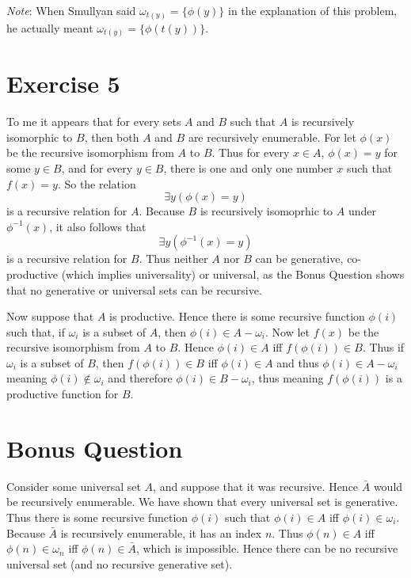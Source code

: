 \documentclass{article}
\theoremstyle{definition}
\begin{document}
\textit{Note}: When Smullyan said $\omega_{t(y)}=\{\phi(y)\}$ in the explanation of this problem, he actually meant $\omega_{t(y)}=\{\phi(t(y))\}$. 

\section*{Exercise 5}
To me it appears that for every sets $A$ and $B$ such that $A$ is recursively isomorphic to $B$, then both $A$ and $B$ are recursively enumerable. For let $\phi(x)$ be the recursive 
isomorphism from $A$ to $B$. Thus for every $x\in A$, $\phi(x)=y$ for some $y\in B$, and for every $y\in B$, there is one and only one number $x$ such that $f(x)=y$. So the relation
\[ \exists y(\phi(x)=y) \] is a recursive relation for $A$. Because $B$ is recursively isomoprhic to $A$ under $\phi^{-1}(x)$, it also follows that
\[ \exists y(\phi^{-1}(x)=y) \] is a recursive relation for $B$. Thus neither $A$ nor $B$ can be generative, co-productive (which implies universality) or universal, as the Bonus Question 
shows that no generative or universal sets can be recursive.


Now suppose that $A$ is productive. Hence there is some recursive function $\phi(i)$ such that, if $\omega_i$ is a subset of $A$, then $\phi(i)\in A-\omega_i$. Now let $f(x)$ be the 
recursive isomorphism from $A$ to $B$. Hence $\phi(i)\in A$ iff $f(\phi(i))\in B$. Thus if $\omega_i$ is a subset of $B$, then $f(\phi(i))\in B$ iff $\phi(i)\in A$ and thus 
$\phi(i)\in A-\omega_i$ meaning $\phi(i)\notin\omega_i$ and therefore $\phi(i)\in B-\omega_i$, thus meaning $f(\phi(i))$ is a productive function for $B$.

\section*{Bonus Question}
Consider some universal set $A$, and suppose that it was recursive. Hence $\bar{A}$ would be recursively enumerable. We have shown that every universal set is generative. 
Thus there is some recursive function $\phi(i)$ such that $\phi(i)\in A$ iff $\phi(i)\in\omega_i$. Because $\bar{A}$ is recursively enumerable, it has an index $n$. Thus 
$\phi(n)\in A$ iff $\phi(n)\in\omega_n$ iff $\phi(n)\in\bar{A}$, which is impossible. Hence there can be no recursive universal set (and no recursive generative set). 
\end{document}
